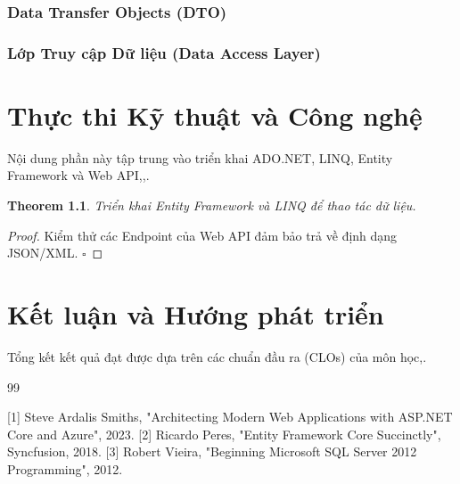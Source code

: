\documentclass[12pt,a4paper,oneside]{book}
\theoremstyle{plain}
\newtheorem{thm}{Theorem}[chapter]
\numberwithin{equation}{chapter} \DeclareMathOperator{\Var}{Var}
\newcommand*{\QEDAa}{\hfill\ensuremath{\square}}
\begin{document}
\subsection{Data Transfer Objects (DTO)}\label{sub3.2.1}
\subsection{Lớp Truy cập Dữ liệu (Data Access Layer)}\label{sub3.2.2}

\chapter{Thực thi Kỹ thuật và Công nghệ}

Nội dung phần này tập trung vào triển khai ADO.NET, LINQ, Entity Framework và Web API,,.
 
 \begin{thm}\label{thmx}
 	Triển khai Entity Framework và LINQ để thao tác dữ liệu.
 \end{thm}
 
 \noindent\begin{proof}
 	Kiểm thử các Endpoint của Web API đảm bảo trả về định dạng JSON/XML.
 	\QEDAa
 \end{proof}

\chapter{Kết luận và Hướng phát triển}
Tổng kết kết quả đạt được dựa trên các chuẩn đầu ra (CLOs) của môn học,.



\begin{thebibliography}{99}

[1] Steve Ardalis Smiths, "Architecting Modern Web Applications with ASP.NET Core and Azure", 2023.
[2] Ricardo Peres, "Entity Framework Core Succinctly", Syncfusion, 2018.
[3] Robert Vieira, "Beginning Microsoft SQL Server 2012 Programming", 2012.
\end{thebibliography}
\end{document}
